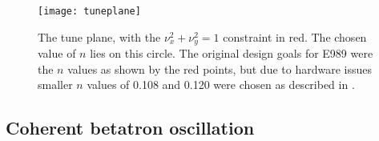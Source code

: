 

\begin{figure}[]
    \centering
    \texttt{[image: tuneplane]}
    \caption[Tune plane]{The tune plane, with the $\nu_{x}^{2} + \nu_{y}^{2} = 1$ constraint in red. The chosen value of $n$ lies on this circle. The original design goals for E989 were the $n$ values as shown by the red points, but due to hardware issues smaller $n$ values of 0.108 and 0.120 were chosen as described in .}
    \label{fig:tuneplane}
\end{figure}



\subsection{Coherent betatron oscillation}
\label{sub:CBO}

